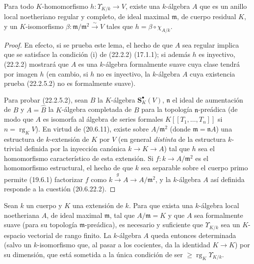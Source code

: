 \begin{lemma}[22.2.5.2]
\label{0.22.2.5.2-fr}
Para todo $K$-homomorfismo $h:\Upsilon_{K/k}\to V$, existe una $k$-álgebra
$A$ que es un anillo local noetheriano regular y completo, de ideal maximal
$\mathfrak m$, de cuerpo residual $K$, y un $K$-isomorfismo
$\beta:\mathfrak m/\mathfrak m^2\xrightarrow{\sim}V$ tales que
$h=\beta\circ\chi_{A/k}$.
\end{lemma}

\begin{proof}
En efecto, si se prueba este lema, el hecho de que $A$ sea regular implica que
se satisface la condición (i) de (22.2.2) (17.1.1); si además $h$ es
inyectivo, (22.2.2) mostrará que $A$ es una $k$-álgebra formalmente suave cuya
clase tendrá por imagen $h$ (en cambio, si $h$ no es inyectivo, la $k$-álgebra
$A$ cuya existencia prueba (22.2.5.2) no es formalmente suave).

Para probar (22.2.5.2), sean $B$ la $K$-álgebra $\mathbf S_K^\bullet(V)$,
$\mathfrak n$ el ideal de aumentación de $B$ y $A=\widehat B$ la $K$-álgebra
completada de $B$ para la topología $\mathfrak n$-preádica (de modo que $A$ es
isomorfa al álgebra de series formales $K[[T_1,\ldots,T_n]]$ si
$n=\operatorname{rg}_KV$). En virtud de (20.6.11), existe sobre
$A/\mathfrak m^2$ (donde $\mathfrak m=\mathfrak nA$) una estructura de
$k$-extensión de $K$ por $V$ (en general \emph{distinta} de la estructura
$k$-trivial definida por la inyección canónica $k\to K\to A$) tal que $h$ sea
el homomorfismo característico de esta extensión. Si
$f:k\to A/\mathfrak m^2$ es el homomorfismo estructural, el hecho de que $k$
sea separable sobre el cuerpo primo permite (19.6.1) factorizar $f$ como
$k\xrightarrow{g}A\to A/\mathfrak m^2$, y la $k$-álgebra $A$ así definida
responde a la cuestión (20.6.22.2).
\end{proof}

\begin{theorem}[22.2.6]
\label{0.22.2.6-fr}
Sean $k$ un cuerpo y $K$ una extensión de $k$. Para que exista una $k$-álgebra
local noetheriana $A$, de ideal maximal $\mathfrak m$, tal que
$A/\mathfrak m=K$ y que $A$ sea formalmente suave (para su topología
$\mathfrak m$-preádica), es necesario y suficiente que $\Upsilon_{K/k}$ sea
un $K$-espacio vectorial de rango finito. La $k$-álgebra $A$ queda entonces
determinada (salvo un $k$-isomorfismo que, al pasar a los cocientes, da la
identidad $K\to K$) por su dimensión, que está sometida a la única condición
de ser $\geqslant\operatorname{rg}_K\Upsilon_{K/k}$.
\end{theorem}

